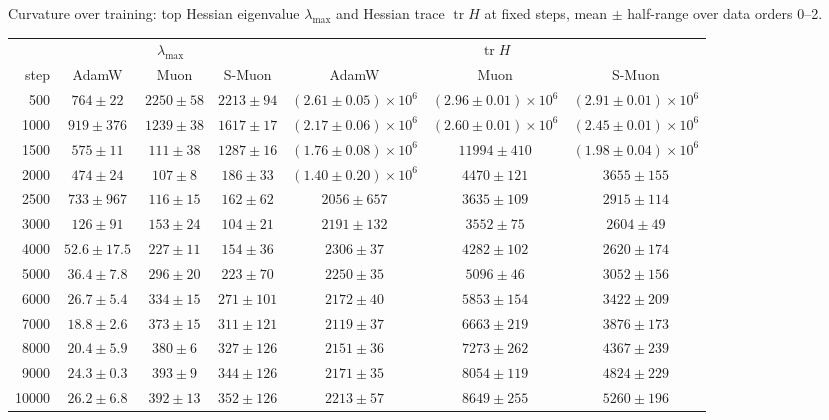 \begin{center}\small
\captionsetup{type=table}
\caption{Curvature over training: top Hessian eigenvalue $\lambda_{\max}$ and Hessian trace $\operatorname{tr}H$ at fixed
steps, mean $\pm$ half-range over data orders 0--2.}
\label{tab:app-curv}
\footnotesize\setlength{\tabcolsep}{4pt}
\begin{tabular}{@{}r|ccc|ccc@{}}
 & \multicolumn{3}{c|}{$\lambda_{\max}$} & \multicolumn{3}{c}{$\operatorname{tr}H$} \\
step & AdamW & Muon & S-Muon & AdamW & Muon & S-Muon \\
\hline
500 & $764 \pm 22$ & $2250 \pm 58$ & $2213 \pm 94$ & $(2.61 \pm 0.05){\times}10^6$ & $(2.96 \pm 0.01){\times}10^6$ & $(2.91 \pm 0.01){\times}10^6$ \\
1000 & $919 \pm 376$ & $1239 \pm 38$ & $1617 \pm 17$ & $(2.17 \pm 0.06){\times}10^6$ & $(2.60 \pm 0.01){\times}10^6$ & $(2.45 \pm 0.01){\times}10^6$ \\
1500 & $575 \pm 11$ & $111 \pm 38$ & $1287 \pm 16$ & $(1.76 \pm 0.08){\times}10^6$ & $11994 \pm 410$ & $(1.98 \pm 0.04){\times}10^6$ \\
2000 & $474 \pm 24$ & $107 \pm 8$ & $186 \pm 33$ & $(1.40 \pm 0.20){\times}10^6$ & $4470 \pm 121$ & $3655 \pm 155$ \\
2500 & $733 \pm 967$ & $116 \pm 15$ & $162 \pm 62$ & $2056 \pm 657$ & $3635 \pm 109$ & $2915 \pm 114$ \\
3000 & $126 \pm 91$ & $153 \pm 24$ & $104 \pm 21$ & $2191 \pm 132$ & $3552 \pm 75$ & $2604 \pm 49$ \\
4000 & $52.6 \pm 17.5$ & $227 \pm 11$ & $154 \pm 36$ & $2306 \pm 37$ & $4282 \pm 102$ & $2620 \pm 174$ \\
5000 & $36.4 \pm 7.8$ & $296 \pm 20$ & $223 \pm 70$ & $2250 \pm 35$ & $5096 \pm 46$ & $3052 \pm 156$ \\
6000 & $26.7 \pm 5.4$ & $334 \pm 15$ & $271 \pm 101$ & $2172 \pm 40$ & $5853 \pm 154$ & $3422 \pm 209$ \\
7000 & $18.8 \pm 2.6$ & $373 \pm 15$ & $311 \pm 121$ & $2119 \pm 37$ & $6663 \pm 219$ & $3876 \pm 173$ \\
8000 & $20.4 \pm 5.9$ & $380 \pm 6$ & $327 \pm 126$ & $2151 \pm 36$ & $7273 \pm 262$ & $4367 \pm 239$ \\
9000 & $24.3 \pm 0.3$ & $393 \pm 9$ & $344 \pm 126$ & $2171 \pm 35$ & $8054 \pm 119$ & $4824 \pm 229$ \\
10000 & $26.2 \pm 6.8$ & $392 \pm 13$ & $352 \pm 126$ & $2213 \pm 57$ & $8649 \pm 255$ & $5260 \pm 196$ \\
\hline
\end{tabular}
\end{center}

